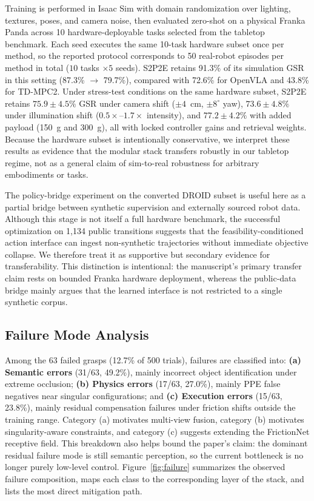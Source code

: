 \documentclass[12pt]{article}
\begin{document}
Training is performed in Isaac Sim with domain randomization over lighting, textures, poses, and camera noise, then evaluated zero-shot on a physical Franka Panda across 10 hardware-deployable tasks selected from the tabletop benchmark. Each seed executes the same 10-task hardware subset once per method, so the reported protocol corresponds to 50 real-robot episodes per method in total ($10$ tasks $\times 5$ seeds). S2P2E retains 91.3\% of its simulation GSR in this setting (87.3\% $\rightarrow$ 79.7\%), compared with 72.6\% for OpenVLA and 43.8\% for TD-MPC2. Under stress-test conditions on the same hardware subset, S2P2E retains $75.9\pm4.5\%$ GSR under camera shift ($\pm4$~cm, $\pm8^\circ$ yaw), $73.6\pm4.8\%$ under illumination shift ($0.5\times$--$1.7\times$ intensity), and $77.2\pm4.2\%$ with added payload (150~g and 300~g), all with locked controller gains and retrieval weights. Because the hardware subset is intentionally conservative, we interpret these results as evidence that the modular stack transfers robustly in our tabletop regime, not as a general claim of sim-to-real robustness for arbitrary embodiments or tasks.

The policy-bridge experiment on the converted DROID subset is useful here as a partial bridge between synthetic supervision and externally sourced robot data. Although this stage is not itself a full hardware benchmark, the successful optimization on 1,134 public transitions suggests that the feasibility-conditioned action interface can ingest non-synthetic trajectories without immediate objective collapse. We therefore treat it as supportive but secondary evidence for transferability. This distinction is intentional: the manuscript's primary transfer claim rests on bounded Franka hardware deployment, whereas the public-data bridge mainly argues that the learned interface is not restricted to a single synthetic corpus.

\subsection{Failure Mode Analysis}

Among the 63 failed grasps (12.7\% of 500 trials), failures are classified into: \textbf{(a) Semantic errors} (31/63, 49.2\%), mainly incorrect object identification under extreme occlusion; \textbf{(b) Physics errors} (17/63, 27.0\%), mainly PPE false negatives near singular configurations; and \textbf{(c) Execution errors} (15/63, 23.8\%), mainly residual compensation failures under friction shifts outside the training range. Category (a) motivates multi-view fusion, category (b) motivates singularity-aware constraints, and category (c) suggests extending the FrictionNet receptive field. This breakdown also helps bound the paper's claim: the dominant residual failure mode is still semantic perception, so the current bottleneck is no longer purely low-level control. Figure~\ref{fig:failure} summarizes the observed failure composition, maps each class to the corresponding layer of the stack, and lists the most direct mitigation path.
\end{document}
